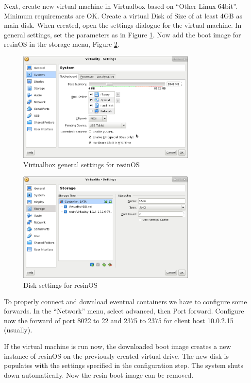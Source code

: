 \documentclass[]{scrartcl}
\begin{document}
Next, create new virtual machine in Virtualbox based on ``Other Linux 64bit''. Minimum requirements are OK. Create a virtual Disk of Size of at least 4GB as main disk. 
When created, open the settings dialogue for the virtual machine. In general settings, set the parameters as in Figure \ref{fig:resingen}. Now add the boot image for resinOS in the storage menu, Figure \ref{fig:resindisk}.

\begin{figure}
	\centering
	\includegraphics[width=0.8\textwidth]{resin-vbox}
	\caption{Virtualbox general settings for resinOS}
	\label{fig:resingen}
\end{figure}

\begin{figure}
	\centering
	\includegraphics[width=0.8\textwidth]{resin-vbox2}
	\caption{Disk settings for resinOS}
	\label{fig:resindisk}
\end{figure}

To properly connect and download eventual containers we have to configure some forwards. In the ``Network'' menu, select advanced, then Port forward. Configure now the forward of port 8022 to 22  and 2375 to 2375 for client host 10.0.2.15 (usually).

If the virtual machine is run now, the downloaded boot image creates a new instance of resinOS on the previously created virtual drive. The new disk is populates with the settings specified in the configuration step. The system shuts down automatically. Now the resin boot image can be removed.
\end{document}
